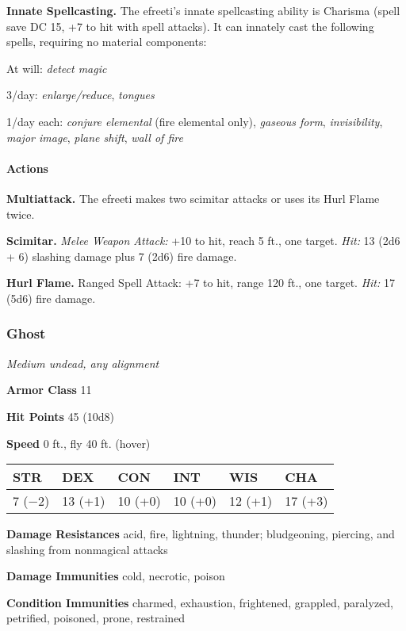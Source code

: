 \documentclass[
]{article}
\begin{document}
\textbf{Innate Spellcasting.} The efreeti's innate spellcasting ability
is Charisma (spell save DC 15, +7 to hit with spell attacks). It can
innately cast the following spells, requiring no material components:

At will: \emph{detect magic}

3/day: \emph{enlarge/reduce}, \emph{tongues}

1/day each: \emph{conjure elemental} (fire elemental only),
\emph{gaseous form}, \emph{invisibility}, \emph{major image},
\emph{plane shift}, \emph{wall of fire}

\hypertarget{actions-2}{%
\paragraph{Actions}\label{actions-2}}

\textbf{Multiattack.} The efreeti makes two scimitar attacks or uses its
Hurl Flame twice.

\textbf{Scimitar.} \emph{Melee Weapon Attack:} +10 to hit, reach 5 ft.,
one target. \emph{Hit:} 13 (2d6 + 6) slashing damage plus 7 (2d6) fire
damage.

\textbf{Hurl Flame.} Ranged Spell Attack: +7 to hit, range 120 ft., one
target. \emph{Hit:} 17 (5d6) fire damage.

\hypertarget{ghost}{%
\subsubsection{Ghost}\label{ghost}}

\emph{Medium undead, any alignment}

\textbf{Armor Class} 11

\textbf{Hit Points} 45 (10d8)

\textbf{Speed} 0 ft., fly 40 ft. (hover)

\begin{longtable}[]{@{}llllll@{}}
\toprule
STR & DEX & CON & INT & WIS & CHA\tabularnewline
\midrule
\endhead
7 (−2) & 13 (+1) & 10 (+0) & 10 (+0) & 12 (+1) & 17 (+3)\tabularnewline
\bottomrule
\end{longtable}

\textbf{Damage Resistances} acid, fire, lightning, thunder; bludgeoning,
piercing, and slashing from nonmagical attacks

\textbf{Damage Immunities} cold, necrotic, poison

\textbf{Condition Immunities} charmed, exhaustion, frightened, grappled,
paralyzed, petrified, poisoned, prone, restrained
\end{document}

